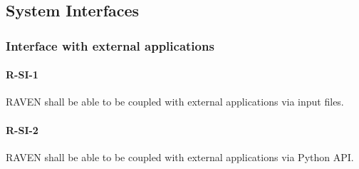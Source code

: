 \subsection{System Interfaces}
\subsubsection{Interface with external applications}
\paragraph{R-SI-1} 
RAVEN shall be able to be coupled with external applications via input files.
\paragraph{R-SI-2} 
RAVEN shall be able to be coupled with external applications via Python API.
